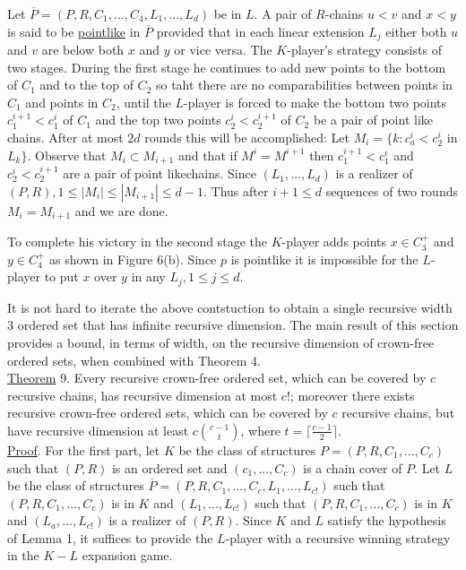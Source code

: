 \documentclass[twoside]{article}
\begin{document}
Let $\overline{P} = (P,R,C_1,...,C_4,L_1,...,L_d)$ be in $L$. A pair of $R$-chains
$u<v$ and $x<y$ is said to be \underline{pointlike} in $\overline{P}$ 
provided that in each linear extension $L_j$ either both $u$ and $v$ are below
both $x$ and $y$ or vice versa. The $K$-player's strategy consists of two 
stages. During the first stage he continues to add new points to the bottom
of $C_1$ and to the top of $C_2$ so taht there are no comparabilities between points 
in $C_1$ and points in $C_2$, until the $L$-player is forced to make the bottom
two points $c_1^{i+1} < c_1^i$ of $C_1$ and the top two points $c_2^i < c_2^{i+1}$
of $C_2$ be a pair of point like chains. After at most $2d$ rounds this will be accomplished:
Let $M_i=\{k: c_a^i < c_2^i$ in $L_k\}$. Observe that $M_i \subset M_{i+1}$ and that if $M^i = M^{i+1}$ then
$c^{i+1}_1 < c^i_1$ and $c_2^i < c_2^{i+1}$ are a pair of point likechains. Since $(L_1,...,L_d)$
is a realizer of $(P,R), 1 \leq |M_i| \leq |M_{i+1}| \leq d-1$. Thus after
$i+1 \leq d$ sequences of two rounds $M_i = M_{i+1}$ and we are done. 

To complete his victory in the second stage the $K$-player adds points
$x \in C_3^+$ and $y \in C_4^+$ as shown in Figure 6(b). Since $p$ is pointlike
it is impossible for the $L$-player to put $x$ over $y$ in any $L_j, 1 \leq j\leq d$.

It is not hard to iterate the above contstuction to obtain a single recursive width 3
ordered set that has infinite recursive dimension. The main result of this section provides
a bound, in terms of width, on the recursive dimension of crown-free ordered sets, when combined with Theorem 4.\\
\newline
\underline{Theorem} 9. \cite{KiersteadMcNultyTrotter84} Every recursive crown-free
ordered set, which can be covered by $c$ recursive chains, has recursive dimension
at most $c!$; moreover there exists recursive crown-free ordered sets, which can be covered
by $c$ recursive chains, but have recursive dimension at least $c {{c-1}\choose t}$, where
$t= \lceil \frac{c-1} {2} \rceil$.\\
\newline
%
%
\underline{Proof}. For the first part, let $K$ be the class of structures
$P = (P,R,C_1,...,C_c)$ such that $(P,R)$ is an ordered set and $(c_1,...,C_c)$
is a chain cover of $P$. Let $L$ be the class of structures
$\overline{P} =(P,R,C_1,...,C_c,L_1,...,L_{c!})$ such that $(P,R,C_1,...,C_c)$ is in
$K$ and $(L_1,...,L_{c!})$ such that $(P,R,C_1,...,C_c)$ is in $K$ and $(L_a,...,L_{c!})$
is a realizer of $(P,R)$. Since $K$ and $L$ satisfy the hypothesis of Lemma 1, it
suffices to provide the $L$-player with a recursive winning strategy in the $K-L$ 
expansion game.
\end{document}
